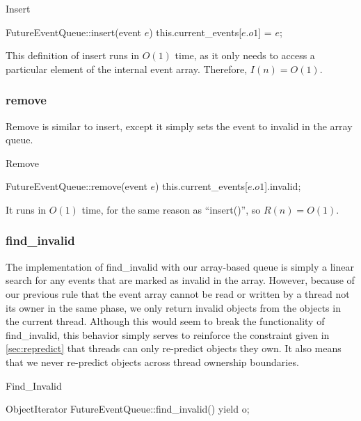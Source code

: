 \documentclass[conference]{IEEEtran}
\begin{document}
\begin{algorithm}
\caption{Insert}
\begin{algorithmic}
\STATE FutureEventQueue::insert(event $e$)
	\STATE this.current\_events[$e.o1$] = $e$;
\ENDIF
\end{algorithmic}
\end{algorithm}

This definition of insert runs in $O(1)$ time, as it only needs to access a particular element of the internal event array.  Therefore, $I(n)=O(1)$.

\subsubsection{remove}

Remove is similar to insert, except it simply sets the event to invalid in the array queue.

\begin{algorithm}
\caption{Remove}
\begin{algorithmic}
\STATE FutureEventQueue::remove(event $e$)
\STATE this.current\_events[$e.o1$].invalid;
\end{algorithmic}
\end{algorithm}

It runs in $O(1)$ time, for the same reason as ``insert()'', so $R(n)=O(1)$.

\subsubsection{find\_invalid}

The implementation of find\_invalid with our array-based queue is simply a linear search for any events that are marked as invalid in the array.
However, because of our previous rule that the event array cannot be read or written by a thread not its owner in the same phase, we only return invalid
objects from the objects in the current thread.  Although this would seem to break the functionality of find\_invalid, this behavior simply serves to reinforce
the constraint given in \ref{sec:repredict} that threads can only re-predict objects they own. It also means that we never re-predict objects across thread
ownership boundaries.  

\begin{algorithm}
\caption{Find\_Invalid}
\begin{algorithmic}
\STATE ObjectIterator FutureEventQueue::find\_invalid()
		\STATE {}
		\STATE yield o;
	\ENDIF
\ENDFOR
\end{algorithmic}
\end{algorithm}
\end{document}
